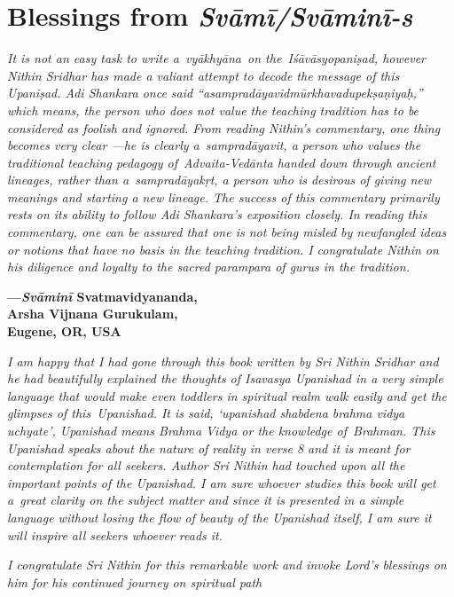 \chapter{Blessings from \emph{Svāmī/Svāminī-s}}

\emph{It is not an easy task to write a~vyākhyāna~on the~Iśāvāsyopaniṣad, however Nithin Sridhar has made a valiant attempt to decode the message of this Upaniṣad. Adi Shankara once said ``asampradāyavidmūrkhavadupekṣaṇiyaḥ,'' which means, the person who does not value the teaching tradition has to be considered as foolish and ignored. From reading Nithin's commentary, one thing becomes very clear ---he is clearly a~sampradāyavit, a person who values the traditional teaching pedagogy of~Advaita-Vedānta handed down through ancient lineages, rather than a~sampradāyakṛt, a person who is desirous of giving new meanings and starting a new lineage. The success of this commentary primarily rests on its ability to follow Adi Shankara's exposition closely. In reading this commentary, one can be assured that one is not being misled by newfangled ideas or notions that have no basis in the teaching tradition. I congratulate Nithin on his diligence and loyalty to the sacred parampara of gurus in the tradition.~}
\medskip

\begin{flushright}
\textbf{---\emph{Svāminī} Svatmavidyananda,}\\
\textbf{Arsha Vijnana Gurukulam,}\\
\textbf{Eugene, OR, USA}
\end{flushright}
\medskip

\emph{I am happy that I had gone through this book written by Sri Nithin Sridhar and he had beautifully explained the thoughts of Isavasya Upanishad in a very simple language that would make even toddlers in spiritual realm walk easily and get the glimpses of this~Upanishad. It is said, `upanishad shabdena brahma vidya uchyate', Upanishad means Brahma Vidya or the knowledge of~Brahman. This Upanishad speaks about the nature of reality in verse 8 and it is meant for contemplation for all seekers. Author Sri Nithin had touched upon all the important points of the Upanishad. I am sure whoever studies this book will get a~great clarity on the subject matter and since it is presented in a simple language without losing the flow of beauty of the Upanishad itself, I am sure it will inspire all seekers whoever reads it.}

\emph{I congratulate Sri Nithin for this remarkable work and invoke Lord's blessings on him for his continued journey on spiritual path}
\medskip

